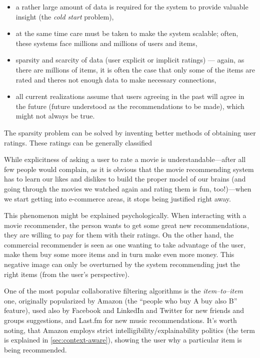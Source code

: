 \begin{itemize}
	\item a rather large amount of data is required for the system to provide valuable insight (the \emph{cold start} problem),
	\item at the same time care must be taken to make the system scalable; often, these systems face millions and millions of users and items,
	\item sparsity and scarcity of data (user explicit or implicit ratings) --- again, as there are millions of items, it is often the case that only some of the items are rated and theres not enough data to make necessary connections,
	\item all current realizations assume that users agreeing in the past will agree in the future (future understood as the recommendations to be made), which might not always be true.
\end{itemize}

The sparsity problem can be solved by inventing better methods of obtaining user ratings. These ratings can be generally classified 

While explicitness of asking a user to rate a movie is understandable---after all few people would complain, as it is obvious that the movie recommending system has to learn our likes and dislikes to build the proper model of our brains (and going through the movies we watched again and rating them is fun, too!)---when we start getting into e-commerce areas, it stops being justified right away.

This phenomenon might be explained psychologically. When interacting with a movie recommender, the person wants to get some great new recommendations, they are willing to pay for them with their ratings. On the other hand, the commercial recommender is seen as one wanting to take advantage of the user, make them buy some more items and in turn make even more money. This negative image can only be overturned by the system recommending just the right items (from the user's perspective).

One of the most popular collaborative filtering algorithms is the \emph{item--to--item} one, originally popularized by Amazon (the ``people who buy A buy also B'' feature), used also by Facebook and LinkedIn and Twitter for new friends and groups suggestions, and Last.fm for new music recommendations. It's worth noting, that Amazon employs strict intelligibility/explainability politics (the term is explained in \cref{sec:context-aware}), showing the user why a particular item is being recommended.

